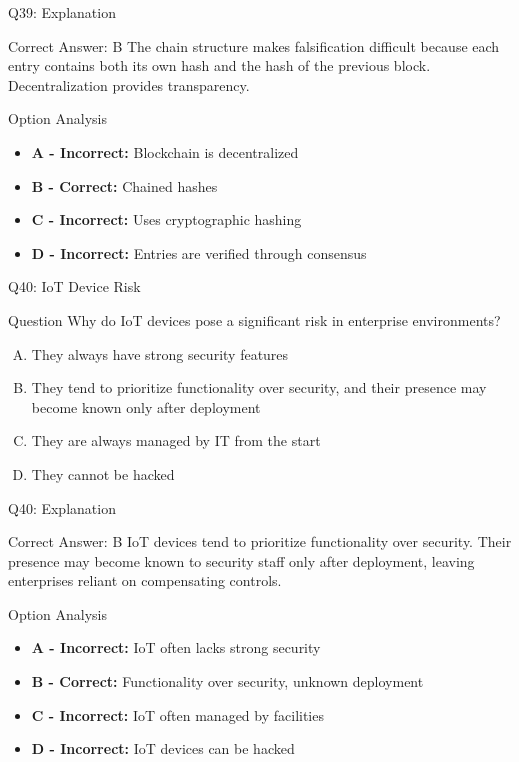 \documentclass{beamer}
\begin{document}
	\begin{frame}{Q39: Explanation}
		\begin{block}{Correct Answer: B}
			The chain structure makes falsification difficult because each entry contains both its own hash and the hash of the previous block. Decentralization provides transparency.
		\end{block}
		\begin{block}{Option Analysis}
			\begin{itemize}
				\item \textbf{A - Incorrect:} Blockchain is decentralized
				\item \textbf{B - Correct:} Chained hashes
				\item \textbf{C - Incorrect:} Uses cryptographic hashing
				\item \textbf{D - Incorrect:} Entries are verified through consensus
			\end{itemize}
		\end{block}
	\end{frame}
	
	\begin{frame}{Q40: IoT Device Risk}
		\begin{block}{Question}
			Why do IoT devices pose a significant risk in enterprise environments?
		\end{block}
		\begin{enumerate}[(A)]
			\item They always have strong security features
			\item They tend to prioritize functionality over security, and their presence may become known only after deployment
			\item They are always managed by IT from the start
			\item They cannot be hacked
		\end{enumerate}
	\end{frame}
	
	\begin{frame}{Q40: Explanation}
		\begin{block}{Correct Answer: B}
			IoT devices tend to prioritize functionality over security. Their presence may become known to security staff only after deployment, leaving enterprises reliant on compensating controls.
		\end{block}
		\begin{block}{Option Analysis}
			\begin{itemize}
				\item \textbf{A - Incorrect:} IoT often lacks strong security
				\item \textbf{B - Correct:} Functionality over security, unknown deployment
				\item \textbf{C - Incorrect:} IoT often managed by facilities
				\item \textbf{D - Incorrect:} IoT devices can be hacked
			\end{itemize}
		\end{block}
	\end{frame}
	
\end{document}
